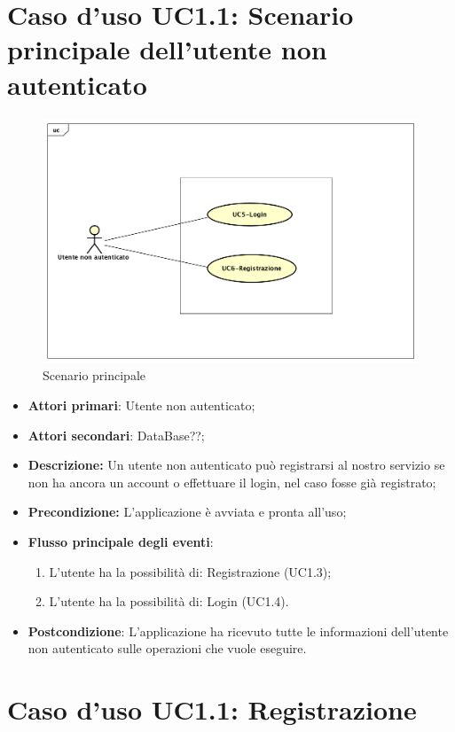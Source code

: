 \section{Caso d'uso UC1.1: Scenario principale dell'utente non autenticato}
\begin{figure}[!ht]
	\centering
	\includegraphics[scale=0.4]{Diagram/UC1.png}
	\caption{Scenario principale}\label{}
\end{figure}
\begin{itemize}
	\item \textbf{Attori primari}: Utente non autenticato;
	\item \textbf{Attori secondari}: DataBase??;
	\item \textbf{Descrizione:} Un utente non  autenticato può registrarsi al nostro servizio se non ha ancora un account o effettuare il login, nel caso fosse già registrato;
	\item \textbf{Precondizione:} L'applicazione è avviata e pronta all'uso;
	\item \textbf{Flusso principale degli eventi}:
	\begin{enumerate}
		\item L'utente ha la possibilità di: Registrazione (UC1.3);
		\item L'utente ha la possibilità di: Login (UC1.4).
	\end{enumerate}
	\item \textbf{Postcondizione}: L'applicazione ha ricevuto tutte le informazioni dell'utente non autenticato sulle operazioni che vuole eseguire.
\end{itemize}
\section{Caso d'uso UC1.1: Registrazione}
